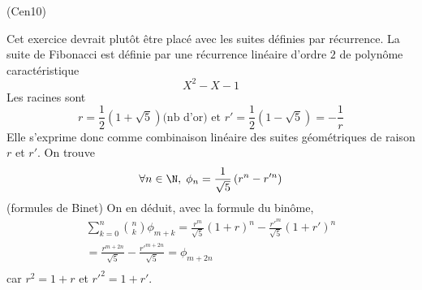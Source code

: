 \begin{tiny}(Cen10)\end{tiny} Cet exercice devrait plutôt être placé avec les suites définies par récurrence.\newline
La suite de Fibonacci est définie par une récurrence linéaire d'ordre $2$ de polynôme caractéristique 
\begin{displaymath}
  X^2 - X - 1
\end{displaymath}
Les racines sont
\begin{displaymath}
  r = \frac{1}{2}\left(1+\sqrt{5}\right) \text{(nb d'or) et } r' = \frac{1}{2}\left(1-\sqrt{5}\right) = -\frac{1}{r} 
\end{displaymath}
Elle s'exprime donc comme combinaison linéaire des suites géométriques de raison $r$ et $r'$. On trouve
\begin{displaymath}
\forall n\in \N,\; \phi_n = \frac{1}{\sqrt{5}}\left( r^n - r'^n\right)   
\end{displaymath}
(formules de Binet) On en déduit, avec la formule du binôme, 
\begin{multline*}
\sum_{k=0}^n\binom{n}{k}\phi_{m+k} = \frac{r^m}{\sqrt{5}}(1+r)^n - \frac{r'^m}{\sqrt{5}}(1+r')^n \\
= \frac{r^{m+2n}}{\sqrt{5}} - \frac{r'^{m+2n}}{\sqrt{5}} = \phi_{m+2n}\\
\end{multline*}
car $r^2 = 1+r$ et $r'^2 = 1 + r'$.